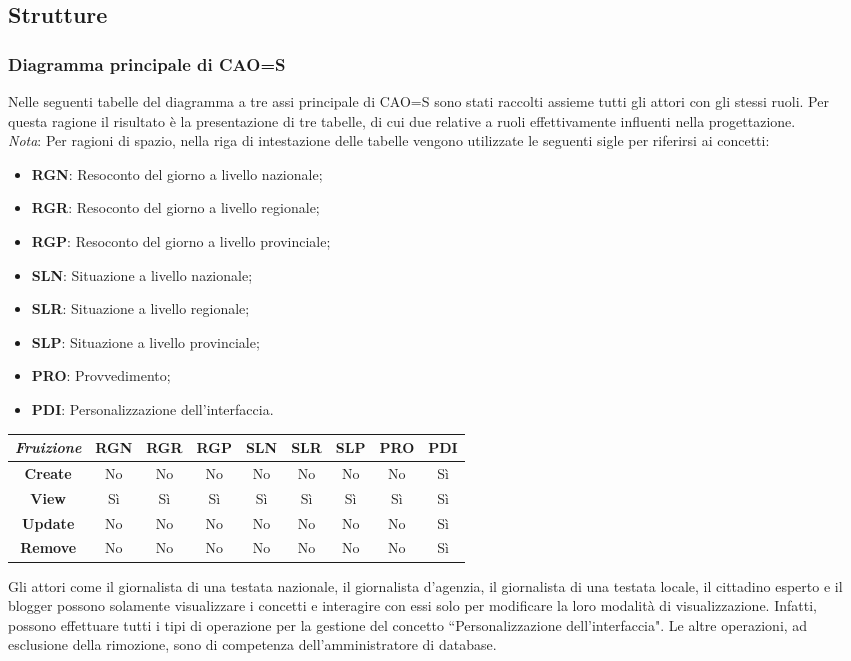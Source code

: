 \subsection{Strutture}

\subsubsection{Diagramma principale di CAO=S}
Nelle seguenti tabelle del diagramma a tre assi principale di CAO=S sono stati raccolti assieme tutti gli attori con gli stessi ruoli.
Per questa ragione il risultato è la presentazione di tre tabelle, di cui due relative a ruoli effettivamente influenti nella progettazione.\\
\textit{Nota}: Per ragioni di spazio, nella riga di intestazione delle tabelle vengono utilizzate le seguenti sigle per riferirsi ai concetti:
\begin{itemize}
    \item \textbf{RGN}: Resoconto del giorno a livello nazionale;
    \item \textbf{RGR}: Resoconto del giorno a livello regionale;
    \item \textbf{RGP}: Resoconto del giorno a livello provinciale;
    \item \textbf{SLN}: Situazione a livello nazionale;
    \item \textbf{SLR}: Situazione a livello regionale;
    \item \textbf{SLP}: Situazione a livello provinciale;
    \item \textbf{PRO}: Provvedimento;
    \item \textbf{PDI}: Personalizzazione dell'interfaccia.
\end{itemize}

{
\renewcommand{\arraystretch}{2}
\begin{longtable}[h]{| c | c | c | c | c | c | c | c | c |}
    \hline
    \textit{Fruizione} & \textbf{RGN} & \textbf{RGR} & \textbf{RGP} & \textbf{SLN} & \textbf{SLR} & \textbf{SLP} & \textbf{PRO} & \textbf{PDI} \\
    \hline
    \endhead
    \textbf{Create} & No & No & No & No & No & No & No & Sì \\
    \hline
    \textbf{View}   & Sì & Sì & Sì & Sì & Sì & Sì & Sì & Sì \\
    \hline
    \textbf{Update} & No & No & No & No & No & No & No & Sì \\
    \hline
    \textbf{Remove} & No & No & No & No & No & No & No & Sì \\
    \hline
\end{longtable}
}
\noindent
Gli attori come il giornalista di una testata nazionale, il giornalista d'agenzia, il giornalista di una testata locale, il cittadino esperto e il blogger possono solamente visualizzare i concetti e interagire con essi solo per modificare la loro modalità di visualizzazione.
Infatti, possono effettuare tutti i tipi di operazione per la gestione del concetto ``Personalizzazione dell'interfaccia".
Le altre operazioni, ad esclusione della rimozione, sono di competenza dell'amministratore di database.


